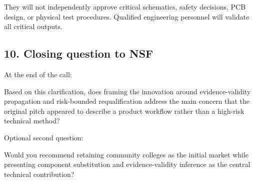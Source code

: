 \documentclass[12pt,letterpaper]{article}
\begin{document}
They will not independently approve critical schematics, safety decisions, PCB design, or physical test procedures. Qualified engineering personnel will validate all critical outputs.

\subsection{10. Closing question to NSF}

At the end of the call:

Based on this clarification, does framing the innovation around evidence-validity propagation and risk-bounded requalification address the main concern that the original pitch appeared to describe a product workflow rather than a high-risk technical method?

Optional second question:

Would you recommend retaining community colleges as the initial market while presenting component substitution and evidence-validity inference as the central technical contribution?
\end{document}
